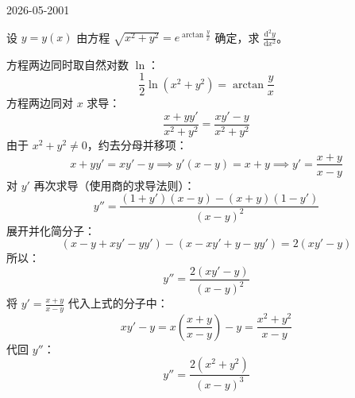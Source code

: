 \begin{mistake}{2026-05-20}{01}

\begin{problemcontent}
设 \(y = y(x)\) 由方程 \(\sqrt{x^2+y^2} = e^{\arctan \frac{y}{x}}\) 确定，求 \(\frac{\mathrm{d}^2 y}{\mathrm{d}x^2}\)。
\end{problemcontent}

\begin{solutioncontent}
方程两边同时取自然对数 \(\ln\)：
\[ \frac{1}{2} \ln(x^2+y^2) = \arctan \frac{y}{x} \]
方程两边同对 \(x\) 求导：
\[ \frac{x+yy'}{x^2+y^2} = \frac{xy' - y}{x^2+y^2} \]
由于 \(x^2+y^2 \neq 0\)，约去分母并移项：
\[ x + yy' = xy' - y \implies y'(x - y) = x + y \implies y' = \frac{x+y}{x-y} \]
对 \(y'\) 再次求导（使用商的求导法则）：
\[ y'' = \frac{(1+y')(x-y) - (x+y)(1-y')}{(x-y)^2} \]
展开并化简分子：
\[ (x - y + xy' - yy') - (x - xy' + y - yy') = 2(xy' - y) \]
所以：
\[ y'' = \frac{2(xy' - y)}{(x-y)^2} \]
将 \(y' = \frac{x+y}{x-y}\) 代入上式的分子中：
\[ xy' - y = x\left(\frac{x+y}{x-y}\right) - y = \frac{x^2+y^2}{x-y} \]
代回 \(y''\)：
\[ y'' = \frac{2(x^2+y^2)}{(x-y)^3} \]
\end{solutioncontent}


\end{mistake}
